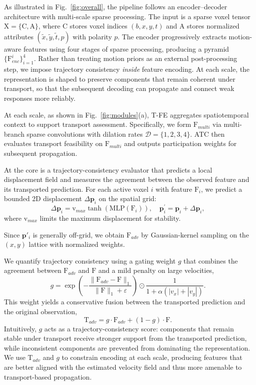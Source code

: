 \documentclass[runningheads]{llncs}
\begin{document}
As illustrated in Fig.~\ref{fig:overall}, the pipeline follows an encoder--decoder architecture with multi-scale sparse processing.
The input is a sparse voxel tensor $\mathrm{X}=\{\mathrm{C},\mathrm{A}\}$, where $\mathrm{C}$ stores voxel indices $(b,x,y,t)$ and $\mathrm{A}$ stores normalized attributes $(\tilde{x},\tilde{y},\tilde{t},p)$ with polarity $p$.
The encoder progressively extracts motion-aware features using four stages of sparse processing, producing a pyramid $\{\mathrm{F}^{i}_{enc}\}_{i=1}^{4}$.
Rather than treating motion priors as an external post-processing step, we impose trajectory consistency \emph{inside} feature encoding.
At each scale, the representation is shaped to preserve components that remain coherent under transport, so that the subsequent decoding can propagate and connect weak responses more reliably.

At each scale, as shown in Fig.~\ref{fig:modules}(a), T-FE aggregates spatiotemporal context to support transport assessment.
Specifically, we form $\mathrm{F}_{multi}$ via multi-branch sparse convolutions with dilation rates $\mathcal{D}=\{1,2,3,4\}$.
ATC then evaluates transport feasibility on $\mathrm{F}_{multi}$ and outputs participation weights for subsequent propagation.

At the core is a trajectory-consistency evaluator that predicts a local displacement field and measures the agreement between the observed feature and its transported prediction.
For each active voxel $i$ with feature $\mathrm{F}_i$, we predict a bounded 2D displacement $\Delta\mathbf{p}_i$ on the spatial grid:
\begin{equation}
\Delta\mathbf{p}_{i}=\mathrm{v}_{max}\tanh(\mathrm{MLP}(\mathrm{F}_{i})), \quad \mathbf{p}_{i}^\prime=\mathbf{p}_{i}+\Delta\mathbf{p}_{i},
\end{equation}
where $\mathrm{v}_{max}$ limits the maximum displacement for stability.

Since $\mathbf{p}'_{i}$ is generally off-grid, we obtain $\mathrm{F}_{adv}$ by Gaussian-kernel sampling on the $(x,y)$ lattice with normalized weights.

We quantify trajectory consistency using a gating weight $g$ that combines the agreement between $\mathrm{F}_{adv}$ and $\mathrm{F}$ and a mild penalty on large velocities,
\begin{equation}
g
=\exp\left(-\frac{\|\mathrm{F}_{adv}-\mathrm{F}\|_{1}}{\|\mathrm{F}\|_{1}+\varepsilon}\right)\odot
\frac{1}{1+\alpha\left(|v_{x}|+|v_{y}|\right)}.
\end{equation}
This weight yields a conservative fusion between the transported prediction and the original observation,
\begin{equation}
\mathrm{T}_{adv}=g\cdot \mathrm{F}_{adv}+(1-g)\cdot \mathrm{F}.
\end{equation}
Intuitively, $g$ acts as a trajectory-consistency score: components that remain stable under transport receive stronger support from the transported prediction, while inconsistent components are prevented from dominating the representation.
We use $\mathrm{T}_{adv}$ and $g$ to constrain encoding at each scale, producing features that are better aligned with the estimated velocity field and thus more amenable to transport-based propagation.
\end{document}
